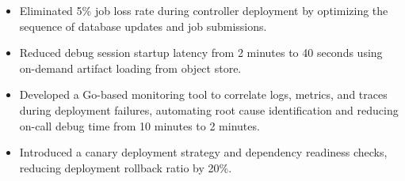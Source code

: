 \documentclass[11pt, letterpaper]{simple-cv}
\begin{document}
\begin{itemize}
	\item Eliminated 5\% job loss rate during controller deployment by optimizing the sequence of database updates and job submissions.
	\item Reduced debug session startup latency from 2 minutes to 40 seconds using on-demand artifact loading from object store.
\end{itemize}

\begin{itemize}
	\item Developed a Go-based monitoring tool to correlate logs, metrics, and traces during deployment failures, automating root cause identification and reducing on-call debug time from 10 minutes to 2 minutes.
	\item Introduced a canary deployment strategy and dependency readiness checks, reducing deployment rollback ratio by 20\%.
\end{itemize}

\end{document}
